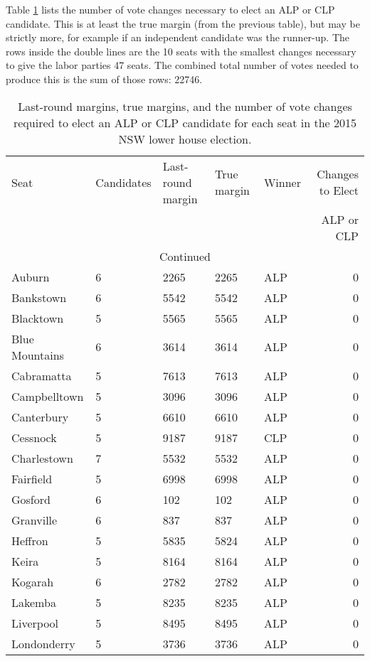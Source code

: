 \documentclass{article}
\begin{document}
Table \ref{tab:NSWchangesElectALP_CLP} lists the number of vote changes necessary to elect an ALP or CLP candidate.  This is at least the true margin (from the previous table), but may be strictly more, for example if an independent candidate was the runner-up.  The rows inside the double lines are the 10 seats with the smallest changes necessary to give the labor parties 47 seats.  The combined total number of votes needed to produce this is the sum of those rows: 22746.

\begin{center}
\begin{longtable}{lllllr}
\caption{Last-round margins, true margins, and the number of vote changes required to elect an ALP or CLP candidate for each seat in the 2015 NSW lower house election.}
\label{tab:NSWchangesElectALP_CLP}\tabularnewline
\hline
	Seat &  Candidates & Last-round margin & True margin & Winner & Changes to Elect \\
	     &             &                   &             &     & ALP or CLP\\
\hline
\endhead
\hline
\multicolumn{6}{c}{Continued}\\
\endfoot
\endlastfoot
Auburn & 6 & 2265 & 2265 & ALP & 0\\
Bankstown & 6 & 5542 & 5542 & ALP & 0\\
Blacktown & 5 & 5565 & 5565 & ALP & 0\\
Blue Mountains & 6 & 3614 & 3614 & ALP & 0\\
Cabramatta & 5 & 7613 & 7613 & ALP & 0\\
Campbelltown & 5 & 3096 & 3096 & ALP & 0\\
Canterbury & 5 & 6610 & 6610 & ALP & 0\\
Cessnock & 5 & 9187 & 9187 & CLP & 0\\
Charlestown & 7 & 5532 & 5532 & ALP & 0\\
Fairfield & 5 & 6998 & 6998 & ALP & 0\\
Gosford & 6 & 102 & 102 & ALP & 0\\
Granville & 6 & 837 & 837 & ALP & 0\\
Heffron & 5 & 5835 & 5824 & ALP & 0\\
Keira & 5 & 8164 & 8164 & ALP & 0\\
Kogarah & 6 & 2782 & 2782 & ALP & 0\\
Lakemba & 5 & 8235 & 8235 & ALP & 0\\
Liverpool & 5 & 8495 & 8495 & ALP & 0\\
Londonderry & 5 & 3736 & 3736 & ALP & 0\\

\end{longtable}
\end{center}
\end{document}
